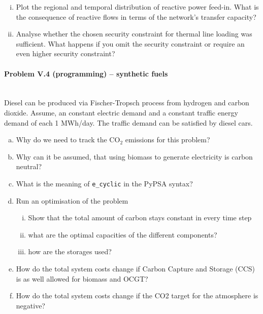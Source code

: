 \documentclass[11pt,a4paper,fleqn]{scrartcl}
\begin{document}
\begin{enumerate}[(a)]
       \begin{enumerate}[(i)]
        \item Plot the regional and temporal distribution of reactive power feed-in. What is the consequence of reactive flows in terms of the network's transfer capacity?
        \item Analyse whether the chosen security constraint for thermal line loading  was sufficient. What happens if you omit the security constraint or require an even higher security constraint?
       \end{enumerate}
\end{enumerate}


\paragraph{Problem V.4 (programming) -- synthetic fuels}~\\
Diesel can be produced via Fischer-Tropsch process from hydrogen and carbon dioxide. Assume, an constant electric demand and a constant traffic energy demand of each 1 MWh/day. The traffic demand can be satisfied by diesel cars.
\begin{enumerate}[(a)]
	\item Why do we need to track the CO$_2$ emissions for this problem?
	\item Why can it be assumed, that using biomass to generate electricity is carbon neutral?
	\item What is the meaning of \texttt{e\_cyclic} in the PyPSA syntax?
	\item Run an optimisation of the problem
		\begin{enumerate}[(i)]
		\item Show that the total amount of carbon stays constant in every time step
		\item what are the optimal capacities of the different components?
		\item how are the storages used?
		\end{enumerate}
	\item How do the total system costs change if Carbon Capture and Storage (CCS) is as well allowed for biomass and OCGT?
	\item How do the total system costs change if the CO2 target for the atmosphere is negative?
\end{enumerate} 
\end{document}

